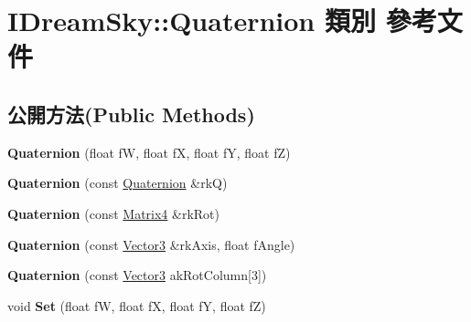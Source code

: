 \hypertarget{class_i_dream_sky_1_1_quaternion}{}\section{I\+Dream\+Sky\+:\+:Quaternion 類別 參考文件}
\label{class_i_dream_sky_1_1_quaternion}
\subsection*{公開方法(Public Methods)}
\begin{DoxyCompactItemize}
\item 
{\bfseries Quaternion} (float fW, float fX, float fY, float fZ)\hypertarget{class_i_dream_sky_1_1_quaternion_a50243fc38f9fadc1193ea9a282961697}{}\label{class_i_dream_sky_1_1_quaternion_a50243fc38f9fadc1193ea9a282961697}

\item 
{\bfseries Quaternion} (const \hyperlink{class_i_dream_sky_1_1_quaternion}{Quaternion} \&rkQ)\hypertarget{class_i_dream_sky_1_1_quaternion_a350ae49ebcaea47c06589bc1fbf47cbd}{}\label{class_i_dream_sky_1_1_quaternion_a350ae49ebcaea47c06589bc1fbf47cbd}

\item 
{\bfseries Quaternion} (const \hyperlink{class_i_dream_sky_1_1_matrix4}{Matrix4} \&rk\+Rot)\hypertarget{class_i_dream_sky_1_1_quaternion_abbd53189e0b59bbef8efefda40a6c3c6}{}\label{class_i_dream_sky_1_1_quaternion_abbd53189e0b59bbef8efefda40a6c3c6}

\item 
{\bfseries Quaternion} (const \hyperlink{class_i_dream_sky_1_1_vector3}{Vector3} \&rk\+Axis, float f\+Angle)\hypertarget{class_i_dream_sky_1_1_quaternion_a4cf6e61e872a0e0e2c2dce7e81a70d8f}{}\label{class_i_dream_sky_1_1_quaternion_a4cf6e61e872a0e0e2c2dce7e81a70d8f}

\item 
{\bfseries Quaternion} (const \hyperlink{class_i_dream_sky_1_1_vector3}{Vector3} ak\+Rot\+Column\mbox{[}3\mbox{]})\hypertarget{class_i_dream_sky_1_1_quaternion_aea3e5fa81e97a7fdf1fff66e8994fca7}{}\label{class_i_dream_sky_1_1_quaternion_aea3e5fa81e97a7fdf1fff66e8994fca7}

\item 
void {\bfseries Set} (float fW, float fX, float fY, float fZ)\hypertarget{class_i_dream_sky_1_1_quaternion_a418489a80d2426dca9709f3a9eba2ece}{}\label{class_i_dream_sky_1_1_quaternion_a418489a80d2426dca9709f3a9eba2ece}


\end{DoxyCompactItemize}
